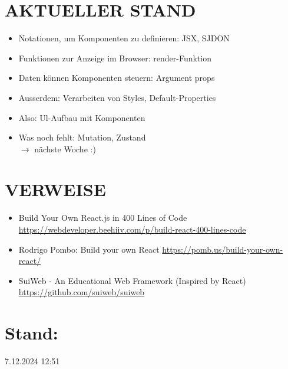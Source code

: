 \documentclass[10pt]{article}
\begin{document}
\section*{AKTUELLER STAND}
\begin{itemize}
  \item Notationen, um Komponenten zu definieren: JSX, SJDON
  \item Funktionen zur Anzeige im Browser: render-Funktion
  \item Daten können Komponenten steuern: Argument props
  \item Ausserdem: Verarbeiten von Styles, Default-Properties
  \item Also: Ul-Aufbau mit Komponenten
  \item Was noch fehlt: Mutation, Zustand\\
$\rightarrow$ nächste Woche :)
\end{itemize}

\section*{VERWEISE}
\begin{itemize}
  \item Build Your Own React.js in 400 Lines of Code \href{https://webdeveloper.beehiiv.com/p/build-react-400-lines-code}{https://webdeveloper.beehiiv.com/p/build-react-400-lines-code}
  \item Rodrigo Pombo: Build your own React \href{https://pomb.us/build-your-own-react/}{https://pomb.us/build-your-own-react/}
  \item SuiWeb - An Educational Web Framework (Inspired by React) \href{https://github.com/suiweb/suiweb}{https://github.com/suiweb/suiweb}
\end{itemize}

\section*{Stand:}
7.12.2024 12:51
\end{document}
